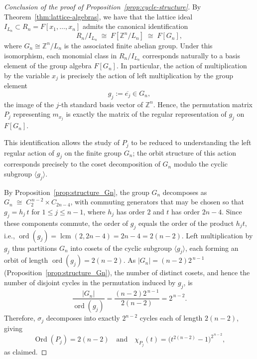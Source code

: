 \documentclass[11pt]{amsart}
\theoremstyle{plain}
\theoremstyle{definition}
\theoremstyle{remark}
\begin{document}
\begin{proof}[Conclusion of the proof of Proposition~\ref{prop:cycle-structure}]
	By Theorem~\ref{thm:lattice-algebras}, we have that the lattice ideal \( I_{L_n} \subset R_n = F[x_1,\dots,x_n] \) admits the canonical identification  
	\[
	R_n / I_{L_n} \;\cong\; F[\mathbb{Z}^n / L_n] \;\cong\; F[G_n],
	\]
	where \( G_n \cong \mathbb{Z}^n / L_n \) is the associated finite abelian group.  
	Under this isomorphism, each monomial class in \( R_n / I_{L_n} \) corresponds naturally to a basis element of the group algebra \( F[G_n] \).  
	In particular, the action of multiplication by the variable \( x_j \) is precisely the action of left multiplication by the group element 
	\[
	g_j := \overline{e_j} \in G_n,
	\]
	the image of the \( j \)-th standard basis vector of \( \mathbb{Z}^n \).  
	Hence, the permutation matrix \( P_j \) representing \( m_{x_j} \) is exactly the matrix of the regular representation of \( g_j \) on \( F[G_n] \).
	
	This identification allows the study of \( P_j \) to be reduced to understanding the left regular action of \( g_j \) on the finite group \( G_n \); the orbit structure of this action corresponds precisely to the coset decomposition of \( G_n \) modulo the cyclic subgroup \( \langle g_j \rangle \).
	
	By Proposition~\ref{prop:structure_Gn}, the group \( G_n \) decomposes as \( G_n \;\cong\; C_2^{\,n-2} \times C_{2n-4}\), with commuting generators that may be chosen so that $g_j=h_j\,t$ for $1\le j\le n-1$, where $h_j$ has order $2$ and $t$ has order $2n-4$. Since these components commute, the order of $g_j$ equals the order of the product $h_j t$, i.e., $\operatorname{ord}(g_j)=\operatorname{lcm}(2,2n-4)=2n-4=2(n-2)$. 
	Left multiplication by \( g_j \) thus partitions \( G_n \) into cosets of the cyclic subgroup  \( \langle g_j \rangle \), each forming an orbit of length $\operatorname{ord}(g_j)=2(n-2)$.  
	As \(|G_n| = (n-2)2^{\,n-1}\) (Proposition~\ref{prop:structure_Gn}), the number of distinct cosets, and hence the number of disjoint cycles in the permutation induced by \( g_j \), is
	\[
	\frac{|G_n|}{\operatorname{ord}(g_j)} = \frac{(n-2)2^{\,n-1}}{2(n-2)} = 2^{\,n-2}.
	\]
	Therefore,  \( \sigma_j \) decomposes into exactly \( 2^{n-2} \) cycles each of length \( 2(n-2) \), giving
	\[
	\operatorname{Ord}(P_j) = 2(n-2)
	\quad\text{and}\quad
	\chi_{P_j}(t) = \big(t^{2(n-2)} - 1\big)^{2^{\,n-2}},
	\]
	as claimed.
\end{proof}

\newpage
\appendix
\renewcommand{\thesection}{A} %
\end{document}
